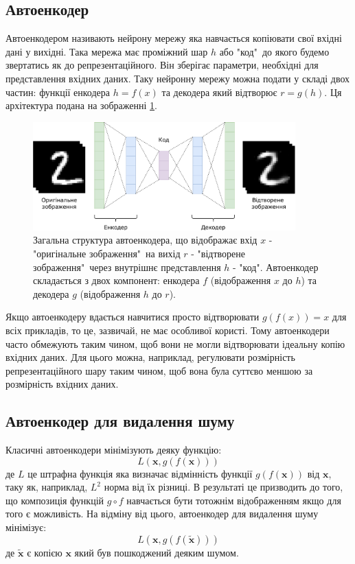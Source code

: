 \documentclass[14pt,a4paper]{extarticle}
\newcounter{e}
\numberwithin{equation}{section}
\numberwithin{figure}{section}
\begin{document}
	\subsection{Автоенкодер}
	
	Автоенкодером називають нейрону мережу яка навчається копіювати свої вхідні дані у вихідні. Така мережа має проміжний шар $h$ або "код"\, до якого будемо звертатись як до репрезентаційного. Він зберігає параметри, необхідні для представлення вхідних даних. Таку нейронну мережу можна подати у складі двох частин: функції енкодера $h = f(x)$ та декодера який відтворює $r = g(h)$. Ця архітектура подана на зображенні \ref*{fig:autoencoder-graph}.
	\begin{figure}[H]
		\centering
		\includegraphics[width=0.9\textwidth]{../resources/autoencoder.pdf}
		\caption{Загальна структура автоенкодера, що відображає вхід $x$ - "оригінальне зображення"\ на вихід $r$ - "відтворене зображення"\ через внутрішнє представлення $h$ - "код". Автоенкодер складається з двох компонент: енкодера $f$ (відображення $x$ до $h$) та декодера $g$ (відображення $h$ до $r$).}
		\label{fig:autoencoder-graph}
	\end{figure}
	Якщо автоенкодеру вдається навчитися просто відтворювати $g(f(x)) = x$ для всіх прикладів, то це, зазвичай, не має особливої користі. Тому автоенкодери часто обмежують таким чином, щоб вони не могли відтворювати ідеальну копію вхідних даних. Для цього можна, наприклад, регулювати розмірність репрезентаційного шару таким чином, щоб вона була суттєво меншою за розмірність вхідних даних.
	
	\newpage
	\subsection{Автоенкодер для видалення шуму}
	Класичні автоенкодери мінімізують деяку функцію:
	\begin{equation}
		L(\boldsymbol{x}, g(f(\boldsymbol{x})))
	\end{equation}
	де $L$ це штрафна функція яка визначає відмінність функції $g(f(\boldsymbol{x}))$ від $\boldsymbol{x}$, таку як, наприклад,  $L^{2}$ норма від їх різниці. В результаті це призводить до того, що композиція функцій $g \circ f$ навчається бути тотожнім відображенням якщо для того є можливість. На відміну від цього, автоенкодер для видалення шуму мінімізує:
	\begin{equation}
		L(\boldsymbol{x}, g(f(\tilde{\boldsymbol{x}})))
	\end{equation}
	де $\tilde{\boldsymbol{x}}$ є копією $\boldsymbol{x}$ який був пошкоджений деяким шумом. 
	
\end{document}
